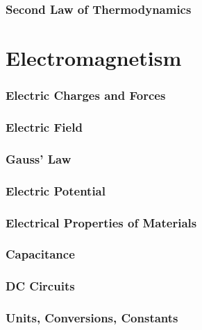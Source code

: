 \documentclass{article}
\begin{document}
\section{Second Law of Thermodynamics}


\clearpage
\part{Electromagnetism}

\section{Electric Charges and Forces}


\section{Electric Field}


\section{Gauss' Law}


\section{Electric Potential}


\section{Electrical Properties of Materials}


\section{Capacitance}


\section{DC Circuits}


\clearpage
{} %
\section{Units, Conversions, Constants}

\end{document}
